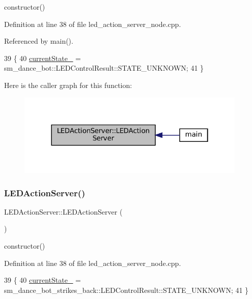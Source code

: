 constructor() 

Definition at line 38 of file led\+\_\+action\+\_\+server\+\_\+node.\+cpp.



Referenced by main().


\begin{DoxyCode}
39   \{
40     \hyperlink{classLEDActionServer_a1dc456e987dc331501ad6ff2215661ff}{currentState\_} =  sm\_dance\_bot::LEDControlResult::STATE\_UNKNOWN;
41   \}
\end{DoxyCode}
Here is the caller graph for this function\+:
\nopagebreak
\begin{figure}[H]
\begin{center}
\leavevmode
\includegraphics[width=310pt]{classLEDActionServer_a6978c43940438b9fd8bfcd6b443092d3_icgraph}
\end{center}
\end{figure}
\mbox{\label{classLEDActionServer_a6978c43940438b9fd8bfcd6b443092d3}} 
\subsubsection{\texorpdfstring{L\+E\+D\+Action\+Server()}{LEDActionServer()}\hspace{0.1cm}{\footnotesize\ttfamily [2/2]}}
{\footnotesize\ttfamily L\+E\+D\+Action\+Server\+::\+L\+E\+D\+Action\+Server (\begin{DoxyParamCaption}{ }\end{DoxyParamCaption})\hspace{0.3cm}{\ttfamily [inline]}}

constructor() 

Definition at line 38 of file led\+\_\+action\+\_\+server\+\_\+node.\+cpp.


\begin{DoxyCode}
39   \{
40     \hyperlink{classLEDActionServer_a1dc456e987dc331501ad6ff2215661ff}{currentState\_} =  sm\_dance\_bot\_strikes\_back::LEDControlResult::STATE\_UNKNOWN;
41   \}
\end{DoxyCode}


